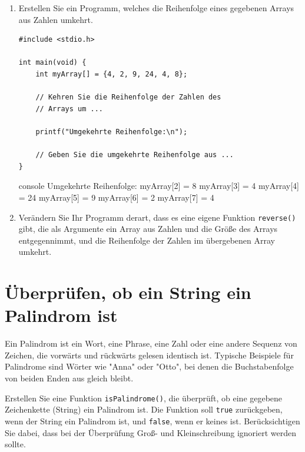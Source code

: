 \begin{enumerate}
    \item Erstellen Sie ein Programm, welches die Reihenfolge eines gegebenen
    Arrays aus Zahlen umkehrt.

\Vorlage
\begin{verbatim}
#include <stdio.h>

int main(void) {
    int myArray[] = {4, 2, 9, 24, 4, 8};

    // Kehren Sie die Reihenfolge der Zahlen des
    // Arrays um ...

    printf("Umgekehrte Reihenfolge:\n");

    // Geben Sie die umgekehrte Reihenfolge aus ...
}
\end{verbatim}

\begin{mybox}[Bildschirmausgabe]{console}
Umgekehrte Reihenfolge:
myArray[2] = 8
myArray[3] = 4
myArray[4] = 24
myArray[5] = 9
myArray[6] = 2
myArray[7] = 4
\end{mybox}

  \item Verändern Sie Ihr Programm derart, dass es eine eigene Funktion
  \texttt{reverse()} gibt, die als Argumente ein Array aus Zahlen und die
  Größe des Arrays entgegennimmt, und die Reihenfolge der Zahlen im übergebenen
  Array umkehrt.
\end{enumerate}



\chapter{Überprüfen, ob ein String ein Palindrom ist}

\vspace{10pt}

Ein Palindrom ist ein Wort, eine Phrase, eine Zahl oder eine andere Sequenz von
Zeichen, die vorwärts und rückwärts gelesen identisch ist. Typische Beispiele
für Palindrome sind Wörter wie "Anna" oder "Otto", bei denen die Buchstabenfolge
von beiden Enden aus gleich bleibt.

Erstellen Sie eine Funktion \texttt{isPalindrome()}, die überprüft, ob
eine gegebene Zeichenkette (String) ein Palindrom ist. Die Funktion soll
\texttt{true} zurückgeben, wenn der String ein Palindrom ist, und
\texttt{false}, wenn er keines ist. Berücksichtigen Sie dabei, dass bei
der Überprüfung Groß- und Kleinschreibung ignoriert werden sollte.

